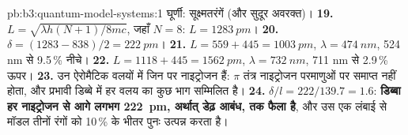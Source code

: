\begin{solution}{pb:b3:quantum-model-systems:1}
घूर्णी: सूक्ष्मतरंगें (और सुदूर अवरक्त)।
\textbf{19.} $L = \sqrt{\lambda h(N+1)/8mc}$, जहाँ $N = 8$: $L = \qty{1283}{pm}$।
\textbf{20.} $\delta = (1283 - 838)/2 = \qty{222}{pm}$।
\textbf{21.} $L = 559 + 445 = \qty{1003}{pm}$, $\lambda = \qty{474}{nm}$, 524 nm से 9.5\,\%
नीचे।
\textbf{22.} $L = 1118 + 445 = \qty{1562}{pm}$, $\lambda = \qty{732}{nm}$, 711 nm से 2.9\,\%
ऊपर।
\textbf{23.} उन ऐरोमैटिक वलयों में जिन पर नाइट्रोजन हैं: $\pi$
तंत्र नाइट्रोजन परमाणुओं पर समाप्त नहीं होता, और प्रभावी डिब्बे में
हर वलय का कुछ भाग सम्मिलित है।
\textbf{24.} $\delta/l = 222/139.7 = 1.6$: \textbf{डिब्बा हर नाइट्रोजन से आगे
लगभग \qty{222}{pm}, अर्थात् डेढ़ आबंध, तक फैला है}, और उस एक
लंबाई से मॉडल तीनों रंगों को 10\,\% के भीतर पुनः उत्पन्न करता है।
\end{solution}
